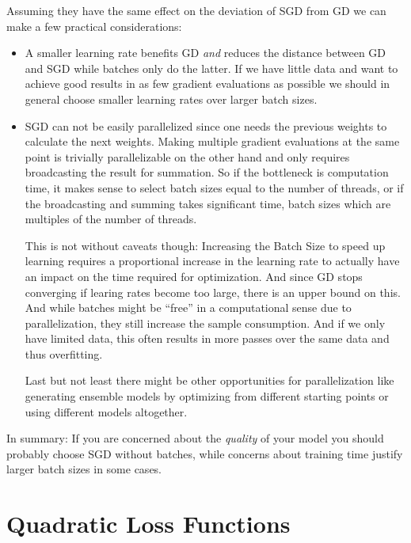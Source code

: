 Assuming they have the same effect on the deviation of SGD from GD we can
make a few practical considerations:
\begin{itemize}
	\item A smaller learning rate benefits GD \emph{and} reduces the distance
	between GD and SGD while batches only do the latter. If we have little data
	and want to achieve good results in as few gradient evaluations as possible
	we should in general choose smaller learning rates over larger batch sizes.
	\item SGD can not be easily parallelized since one needs the previous weights
	to calculate the next weights. Making multiple gradient evaluations at
	the same point is trivially parallelizable on the other hand and only
	requires broadcasting the result for summation. So if the bottleneck is
	computation time, it makes sense to select batch sizes equal to the number of
	threads, or if the broadcasting and summing takes significant time, batch
	sizes which are multiples of the number of threads.

	This is not without caveats though: Increasing the Batch Size to speed up
	learning requires a proportional increase in the learning rate to actually
	have an impact on the time required for optimization. And since GD stops
	converging if learing rates become too large, there is an upper bound on this.
	And while batches might be ``free'' in a computational sense due to
	parallelization, they still increase the sample consumption. And if we only
	have limited data, this often results in more passes over the same data and
	thus overfitting.
	
	Last but not least there might be other opportunities for parallelization
	like generating ensemble models by optimizing from different starting points
	or using different models altogether.
\end{itemize}
In summary: If you are concerned about the \emph{quality} of your model you should
probably choose SGD without batches, while concerns about training time justify
larger batch sizes in some cases.

\textcite{hardtTrainFasterGeneralize2016} \textcite{hofferTrainLongerGeneralize2018}

\section{Quadratic Loss Functions}

